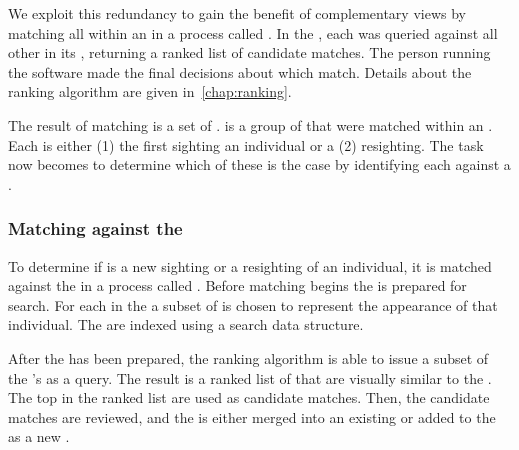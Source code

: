             We exploit this redundancy to gain the benefit of complementary views by matching all \annots{} within an
            \occurrence{} in a process called . In the \GZC{}, each \annot{} was
            queried against all other \annots{} in its \occurrence{}, returning a ranked list of candidate matches. The
            person running the software made the final decisions about which \annots{} match. Details about the ranking
            algorithm are given in~\cref{chap:ranking}.

            The result of \intraoccurrence{} matching is a set of \glossterm{\encounters{}}. \Aan{\encounter{}} is a
            group of \annots{} that were matched within an \occurrence{}. Each \encounter{} is either (1) the first
            sighting an individual or a (2) resighting. The task now becomes to determine which of these is the case by
            identifying each \encounter{} against a \masterdatabase{}.

            \OccurrenceComplementFigure{}
 
        \subsubsection{Matching against the \masterdatabase{}} %
            To determine if \aan{\encounter{}} is a new sighting or a resighting of an individual, it is matched
            against the \masterdatabase{} in a process called . Before matching
            begins the \masterdatabase{} is prepared for search. For each \name{} in the \masterdatabase{} a subset
            of \glossterm{\exemplar{}} \annots{} is chosen to represent the appearance of that individual. The
            \exemplars{} are indexed using a search data structure.

            After the \masterdatabase{} has been prepared, the ranking algorithm is able to issue a subset of the
              \encounter{}'s \annots{} as a query.
            The result is a ranked list of \exemplars{} that are visually similar to the \encounter{}.
            The top \exemplars{} in the ranked list are used as candidate matches.
            Then, the candidate matches are reviewed, and the \encounter{} is either merged into an existing
              \mastername{} or added to the \masterdatabase{} as a new \mastername{}.

